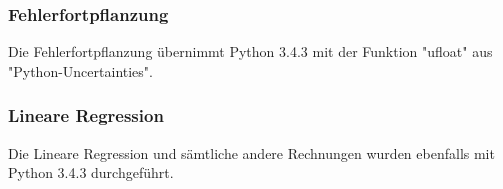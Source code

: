 \subsubsection{Fehlerfortpflanzung}
Die Fehlerfortpflanzung übernimmt Python 3.4.3 mit der Funktion "ufloat" aus "Python-Uncertainties".

\subsubsection{Lineare Regression}
Die Lineare Regression und sämtliche andere Rechnungen wurden ebenfalls mit Python 3.4.3 durchgeführt.
